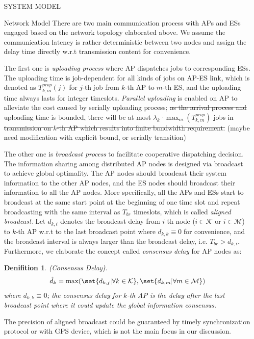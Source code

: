 \documentclass[10pt, conference, letterpaper]{IEEEtran}
\newtheorem{definition}{Denifition}
\DeclarePairedDelimiter\set\{\}
\newcommand{\apSet}{\mathcal{K}}
\newcommand{\esSet}{\mathcal{M}}
\begin{document}
\begin{section}{SYSTEM MODEL}
\begin{subsection}{Network Model}
            There are two main communication process with APs and ESs engaged based on the network topology elaborated above. We assume the communication latency is rather deterministic between two nodes and assign the delay time directly w.r.t transmission content for convenience.

            The first one is \emph{uploading process} where AP dispatches jobs to corresponding ESs. The uploading time is job-dependent for all kinds of jobs on AP-ES link, which is denoted as $T^{prop}_{k,m}(j)$ for $j$-th job from $k$-th AP to $m$-th ES, and the uploading time always lasts for integer timeslots. \emph{Parallel uploading} is enabled on AP to alleviate the cost caused by serially uploading process; \st{as the arrival process and uploading time is bounded, there will be at most $\lambda_k \cdot \max_m(T^{prop}_{k,m})$ jobs in transmission on $k$-th AP which results into finite bandwidth requirement.} (maybe need modification with explicit bound, or serially transition)
            
            The other one is \emph{broadcast process} to facilitate cooperative dispatching decision.
            The information sharing among distributed AP nodes is designed via broadcast to achieve global optimality. The AP nodes should broadcast their system information to the other AP nodes, and the ES nodes should broadcast their information to all the AP nodes. More specifically, all the APs and ESs start to broadcast at the same start point at the beginning of one time slot and repeat broadcasting with the same interval as $T_{br}$ timeslots, which is called \emph{aligned broadcast}. Let $d_{k,i}$ denotes the broadcast delay from $i$-th node ($i\in\apSet$ or $i\in\esSet$) to $k$-th AP w.r.t to the last broadcast point where $d_{k,k} \equiv 0$ for convenience, and the broadcast interval is always larger than the broadcast delay, i.e. $T_{br} > d_{k,i}$.
            Furthermore, we elaborate the concept called \emph{consensus delay} for AP nodes as:
            \begin{definition}
                (Consensus Delay).
                \begin{align}
                    \hat{d}_k = \max(\set{d_{k,j}|\forall k\in\apSet}, \set{d_{k,m}|\forall m\in\esSet})
                \end{align}
                where $d_{k,k} \equiv 0$; the consensus delay for $k$-th AP is the delay after the last broadcast point where it could update the global information consensus.
            \end{definition}
            The precision of aligned broadcast could be guaranteed by timely synchronization protocol or with GPS device, which is not the main focus in our discussion.
        \end{subsection}


\end{section}
\end{document}
